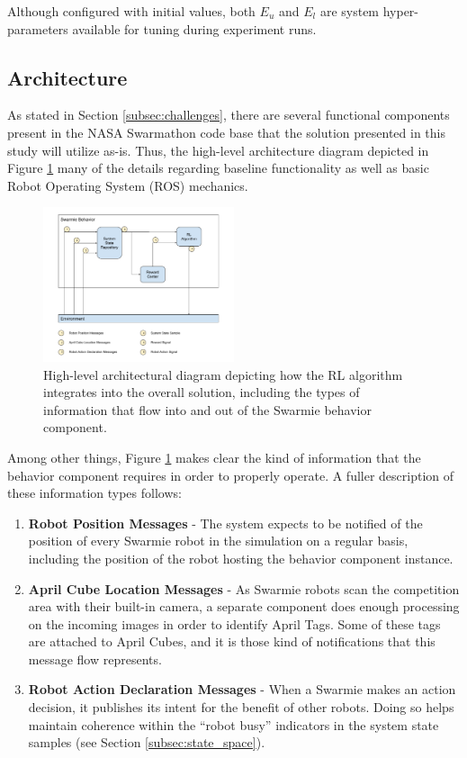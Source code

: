 \documentclass[sigconf,authordraft]{acmart}
\begin{document}
Although configured with initial values, both $E_u$ and $E_l$ are system hyper-parameters available for tuning during experiment runs.

\subsection{Architecture}\label{subsec:architecture}
As stated in Section \ref{subsec:challenges}, there are several functional components present in the NASA Swarmathon code base that the solution presented in this study will utilize as-is. Thus, the high-level architecture diagram depicted in Figure \ref{fig:architecture} many of the details regarding baseline functionality as well as basic Robot Operating System (ROS) mechanics.

\begin{figure}[ht!]
  \centering
  \includegraphics[width=0.5\textwidth]{images/architecture.pdf}
  \caption{High-level architectural diagram depicting how the RL algorithm integrates into the overall solution, including the types of information that flow into and out of the Swarmie behavior component.}
  \label{fig:architecture}
\end{figure}

Among other things, Figure \ref{fig:architecture} makes clear the kind of information that the behavior component requires in order to properly operate. A fuller description of these information types follows:

\begin{enumerate}
  \item \textbf{Robot Position Messages} - The system expects to be notified of the position of every Swarmie robot in the simulation on a regular basis, including the position of the robot hosting the behavior component instance.
  \item \textbf{April Cube Location Messages} - As Swarmie robots scan the competition area with their built-in camera, a separate component does enough processing on the incoming images in order to identify April Tags. Some of these tags are attached to April Cubes, and it is those kind of notifications that this message flow represents.
  \item \textbf{Robot Action Declaration Messages} - When a Swarmie makes an action decision, it publishes its intent for the benefit of other robots. Doing so helps maintain coherence within the ``robot busy'' indicators in the system state samples (see Section \ref{subsec:state_space}).
\end{enumerate}
\end{document}
